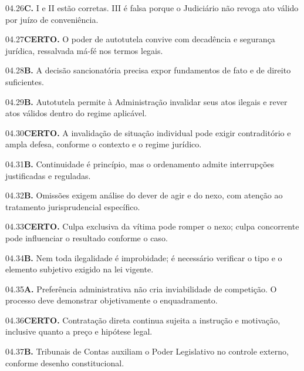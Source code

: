 \begin{solucao}{04.26}\textbf{C.} I e II estão corretas. III é falsa porque o Judiciário não revoga ato válido por juízo de conveniência.\end{solucao}
\begin{solucao}{04.27}\textbf{CERTO.} O poder de autotutela convive com decadência e segurança jurídica, ressalvada má-fé nos termos legais.\end{solucao}
\begin{solucao}{04.28}\textbf{B.} A decisão sancionatória precisa expor fundamentos de fato e de direito suficientes.\end{solucao}
\begin{solucao}{04.29}\textbf{B.} Autotutela permite à Administração invalidar seus atos ilegais e rever atos válidos dentro do regime aplicável.\end{solucao}
\begin{solucao}{04.30}\textbf{CERTO.} A invalidação de situação individual pode exigir contraditório e ampla defesa, conforme o contexto e o regime jurídico.\end{solucao}
\begin{solucao}{04.31}\textbf{B.} Continuidade é princípio, mas o ordenamento admite interrupções justificadas e reguladas.\end{solucao}
\begin{solucao}{04.32}\textbf{B.} Omissões exigem análise do dever de agir e do nexo, com atenção ao tratamento jurisprudencial específico.\end{solucao}
\begin{solucao}{04.33}\textbf{CERTO.} Culpa exclusiva da vítima pode romper o nexo; culpa concorrente pode influenciar o resultado conforme o caso.\end{solucao}
\begin{solucao}{04.34}\textbf{B.} Nem toda ilegalidade é improbidade; é necessário verificar o tipo e o elemento subjetivo exigido na lei vigente.\end{solucao}
\begin{solucao}{04.35}\textbf{A.} Preferência administrativa não cria inviabilidade de competição. O processo deve demonstrar objetivamente o enquadramento.\end{solucao}
\begin{solucao}{04.36}\textbf{CERTO.} Contratação direta continua sujeita a instrução e motivação, inclusive quanto a preço e hipótese legal.\end{solucao}
\begin{solucao}{04.37}\textbf{B.} Tribunais de Contas auxiliam o Poder Legislativo no controle externo, conforme desenho constitucional.\end{solucao}

